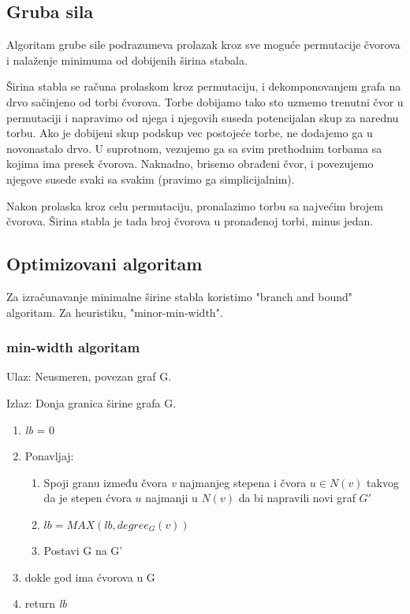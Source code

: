 \documentclass[10pt]{article}
\begin{document}
\subsection{Gruba sila}
Algoritam grube sile podrazumeva prolazak kroz sve moguće permutacije čvorova i nalaženje minimuma od dobijenih širina stabala.

Širina stabla se računa prolaskom kroz permutaciju, i dekomponovanjem grafa na drvo sačinjeno od torbi čvorova. Torbe dobijamo tako sto uzmemo trenutni čvor u permutaciji i napravimo od njega i njegovih suseda potencijalan skup za narednu torbu. Ako je dobijeni skup podskup vec postojeće torbe, ne dodajemo ga u novonastalo drvo. U suprotnom, vezujemo ga sa svim prethodnim torbama sa kojima ima presek čvorova. Naknadno, brisemo obrađeni čvor, i povezujemo njegove susede svaki sa svakim (pravimo ga simplicijalnim).

Nakon prolaska kroz celu permutaciju, pronalazimo torbu sa najvećim brojem čvorova. Širina stabla je tada broj čvorova u pronađenoj torbi, minus jedan.
\subsection{Optimizovani algoritam}
Za izračunavanje minimalne širine stabla koristimo "branch and bound" algoritam. Za heuristiku, "minor-min-width".

\subsubsection{min-width algoritam}

Ulaz: Neusmeren, povezan graf G.

Izlaz: Donja granica širine grafa G.

\begin{enumerate}
    \item \textit{lb} = 0
    \item Ponavljaj:
    \begin{enumerate}
    \item Spoji granu između čvora \textit{v} najmanjeg stepena i čvora $u\in N(v)$ takvog da je stepen ćvora $u$ najmanji u $N(v)$ da bi napravili novi graf $G'$
    \item $lb = MAX(lb, degree_G(v))$
    \item Postavi G na G'
    \end{enumerate}
    \item dokle god ima ćvorova u G
    \item return \textit{lb}
\end{enumerate}
\end{document}
